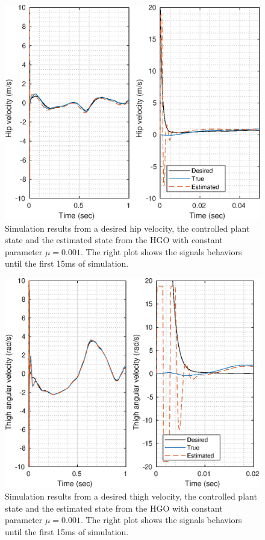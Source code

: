 \documentclass[letterpaper, 10 pt, conference]{ieeeconf}  %
\theoremstyle{plain}
\theoremstyle{definition}
\theoremstyle{remark}
\begin{document}
\begin{figure}[h!]
	\begin{center}
	\includegraphics[width = \columnwidth]{Figs/dq_hip_mu_1e-03.eps}
	\caption{ Simulation results from a desired hip velocity, the controlled plant state and the estimated state from the HGO with constant parameter $\mu=0.001$. The right plot shows the signals behaviors until the first 15ms of simulation.}
	\label{fig:dhip}
	\end{center}
\end{figure}
%
%
\begin{figure}[h!]
	\begin{center}
	\includegraphics[width = \columnwidth]{Figs/dq_thigh_mu_1e-03.eps}
	\caption{Simulation results from a desired thigh velocity, the controlled plant state and the estimated state from the HGO with constant parameter $\mu=0.001$. The right plot shows the signals behaviors until the first 15ms of simulation.}
	\label{fig:dthigh}
	\end{center}
\end{figure}
\end{document}
